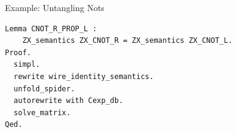 \documentclass[final]{beamer}
\newlength{\colwidth}
\newcommand{\tikzfig}[1]{%
\IfFileExists{#1.tikz}
  {}
  {%
    \IfFileExists{./figures/#1.tikz}
      {}
      {\tikz[baseline=-0.5em]{\node[draw=red,font=\color{red},fill=red!10!white] {\textit{#1}};}}%
  }%
}
\begin{document}
\begin{frame}[t, fragile]
\begin{columns}[t]
\begin{column}{\colwidth}
\begin{block}{Example: Untangling Nots}
\begin{lstlisting}
Lemma CNOT_R_PROP_L : 
    ZX_semantics ZX_CNOT_R = ZX_semantics ZX_CNOT_L.
Proof.
  simpl.
  rewrite wire_identity_semantics.
  unfold_spider.
  autorewrite with Cexp_db.
  solve_matrix.
Qed.
\end{lstlisting}
\vspace{-15mm}
      

  \end{block}
%
%     
%
%
%
%

\end{column}
\end{columns}
\end{frame}
\end{document}
